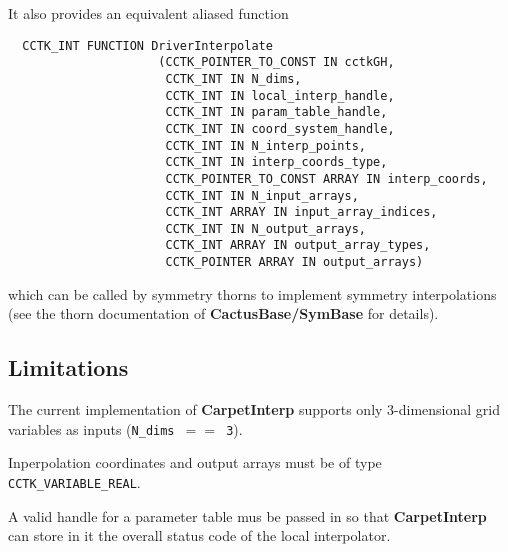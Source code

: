 It also provides an equivalent aliased function
\begin{verbatim}
  CCTK_INT FUNCTION DriverInterpolate
                     (CCTK_POINTER_TO_CONST IN cctkGH,
                      CCTK_INT IN N_dims,
                      CCTK_INT IN local_interp_handle,
                      CCTK_INT IN param_table_handle,
                      CCTK_INT IN coord_system_handle,
                      CCTK_INT IN N_interp_points,
                      CCTK_INT IN interp_coords_type,
                      CCTK_POINTER_TO_CONST ARRAY IN interp_coords,
                      CCTK_INT IN N_input_arrays,
                      CCTK_INT ARRAY IN input_array_indices,
                      CCTK_INT IN N_output_arrays,
                      CCTK_INT ARRAY IN output_array_types,
                      CCTK_POINTER ARRAY IN output_arrays)
\end{verbatim}
which can be called by symmetry thorns to implement symmetry interpolations
(see the thorn documentation of {\bf CactusBase/SymBase} for details).


\subsection{Limitations}

The current implementation of {\bf CarpetInterp} supports only 3-dimensional
grid variables as inputs ({\tt N\_dims $==$ 3}).

Inperpolation coordinates and output arrays must be of type
{\tt CCTK\_VARIABLE\_REAL}.

A valid handle for a parameter table mus be passed in so that {\bf CarpetInterp}
can store in it the overall status code of the local interpolator.




